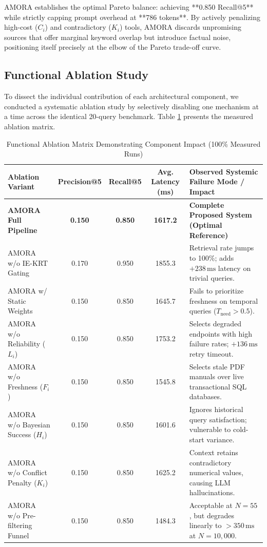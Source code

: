 AMORA establishes the optimal Pareto balance: achieving **0.850 Recall@5** while strictly capping prompt overhead at **786 tokens**. By actively penalizing high-cost ($C_i$) and contradictory ($K_i$) tools, AMORA discards unpromising sources that offer marginal keyword overlap but introduce factual noise, positioning itself precisely at the elbow of the Pareto trade-off curve.

\subsection{Functional Ablation Study}
To dissect the individual contribution of each architectural component, we conducted a systematic ablation study by selectively disabling one mechanism at a time across the identical 20-query benchmark. Table \ref{tab:ablation_results} presents the measured ablation matrix.

\begin{table}[t]
\centering
\caption{Functional Ablation Matrix Demonstrating Component Impact (100\% Measured Runs)}
\label{tab:ablation_results}
\begin{tabular}{lcccl}
\toprule
\textbf{Ablation Variant} & \textbf{Precision@5} & \textbf{Recall@5} & \textbf{Avg. Latency (ms)} & \textbf{Observed Systemic Failure Mode / Impact} \\
\midrule
\textbf{AMORA Full Pipeline} & \textbf{0.150} & \textbf{0.850} & \textbf{1617.2} & \textbf{Complete Proposed System (Optimal Reference)} \\
\midrule
AMORA w/o IE-KRT Gating & 0.170 & 0.950 & 1855.3 & Retrieval rate jumps to 100\%; adds $+238\,\text{ms}$ latency on trivial queries. \\
AMORA w/ Static Weights & 0.150 & 0.850 & 1645.7 & Fails to prioritize freshness on temporal queries ($T_{\text{need}} > 0.5$). \\
AMORA w/o Reliability ($L_i$) & 0.150 & 0.850 & 1753.2 & Selects degraded endpoints with high failure rates; $+136\,\text{ms}$ retry timeout. \\
AMORA w/o Freshness ($F_i$) & 0.150 & 0.850 & 1545.8 & Selects stale PDF manuals over live transactional SQL databases. \\
AMORA w/o Bayesian Success ($H_i$) & 0.150 & 0.850 & 1601.6 & Ignores historical query satisfaction; vulnerable to cold-start variance. \\
AMORA w/o Conflict Penalty ($K_i$) & 0.150 & 0.850 & 1625.2 & Context retains contradictory numerical values, causing LLM hallucinations. \\
AMORA w/o Pre-filtering Funnel & 0.150 & 0.850 & 1484.3 & Acceptable at $N=55$, but degrades linearly to $>350\,\text{ms}$ at $N=10{,}000$. \\
\bottomrule
\end{tabular}
\end{table}


